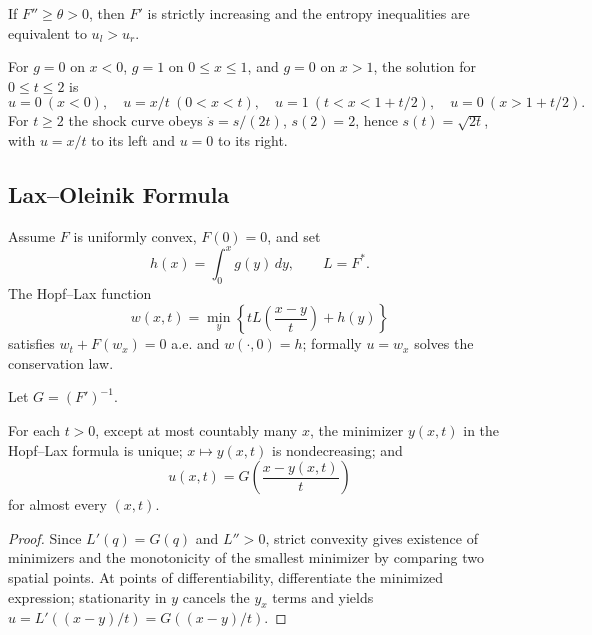 \begin{remark}
\label{rem:entropy-condition-uniform-convexity}
If $F''\ge\theta>0$, then $F'$ is strictly increasing and the entropy
inequalities are equivalent to $u_l>u_r$.
\end{remark}

\begin{example}
\label{ex:burgers-triangular-shock-wave}
For $g=0$ on $x<0$, $g=1$ on $0\le x\le1$, and $g=0$ on $x>1$, the
solution for $0\le t\le2$ is
\[
u=0\ (x<0),\quad u=x/t\ (0<x<t),\quad u=1\ (t<x<1+t/2),
\quad u=0\ (x>1+t/2).
\]
For $t\ge2$ the shock curve obeys
$\dot s=s/(2t)$, $s(2)=2$, hence $s(t)=\sqrt{2t}$, with $u=x/t$ to its
left and $u=0$ to its right.
\end{example}

\subsection{Lax--Oleinik Formula}
\label{sec:lax-oleinik-formula}

Assume $F$ is uniformly convex, $F(0)=0$, and set
\[
h(x)=\int_0^xg(y)\,dy,\qquad L=F^*.
\]
The Hopf--Lax function
\[
w(x,t)=\min_y\left\{tL\left(\frac{x-y}{t}\right)+h(y)\right\}
\]
satisfies $w_t+F(w_x)=0$ a.e. and $w(\cdot,0)=h$; formally $u=w_x$ solves
the conservation law.

Let $G=(F')^{-1}$.

\begin{theorem}
\label{thm:lax-oleinik-formula}
For each $t>0$, except at most countably many $x$, the minimizer $y(x,t)$
in the Hopf--Lax formula is unique; $x\mapsto y(x,t)$ is nondecreasing; and
\[
u(x,t)=G\left(\frac{x-y(x,t)}{t}\right)
\]
for almost every $(x,t)$.
\end{theorem}

\begin{proof}
\sketch Since $L'(q)=G(q)$ and $L''>0$, strict convexity gives existence of
minimizers and the monotonicity of the smallest minimizer by comparing two
spatial points. At points of differentiability, differentiate the minimized
expression; stationarity in $y$ cancels the $y_x$ terms and yields
$u=L'((x-y)/t)=G((x-y)/t)$.
\end{proof}


